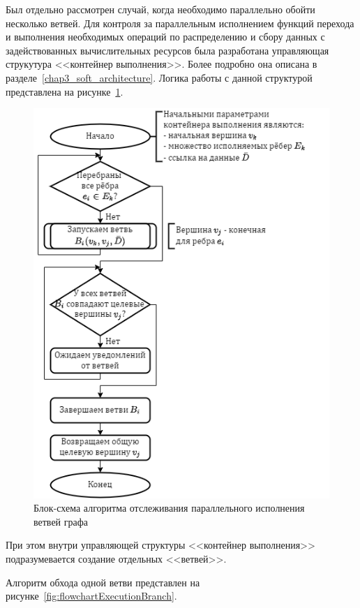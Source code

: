 Был отдельно рассмотрен случай, когда необходимо параллельно обойти несколько ветвей. Для контроля за параллельным исполнением функций перехода и выполнения необходимых операций по распределению и сбору данных с задействованных вычислительных ресурсов была разработана управляющая струкутура <<контейнер выполнения>>. Более подробно она описана в разделе~\ref{chap3_soft_architecture}. Логика работы с данной структурой представлена на рисунке~\ref{fig:flowchartExecutionContainer}.
\begin{figure}[!ht]
    \centering
    \includegraphics[height=0.45\textheight]{figures/flowchart.executionContainer.png}
    \caption{Блок-схема алгоритма отслеживания параллельного исполнения ветвей графа}
    \label{fig:flowchartExecutionContainer}
\end{figure}

При этом внутри управляющей структуры <<контейнер выполнения>> подразумевается создание отдельных <<ветвей>>.

Алгоритм обхода одной ветви представлен на рисунке~\ref{fig:flowchartExecutionBranch}.

